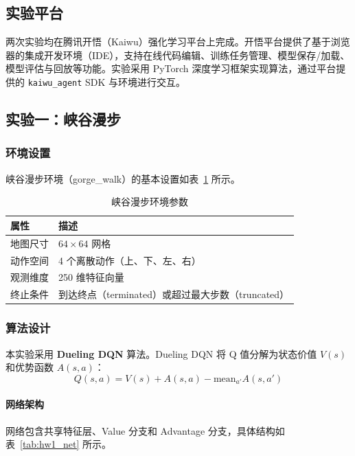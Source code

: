 \documentclass[12pt,a4paper]{article}
\begin{document}
\subsection{实验平台}

两次实验均在腾讯开悟（Kaiwu）强化学习平台上完成。开悟平台提供了基于浏览器的集成开发环境（IDE），支持在线代码编辑、训练任务管理、模型保存/加载、模型评估与回放等功能。实验采用 PyTorch 深度学习框架实现算法，通过平台提供的 \texttt{kaiwu\_agent} SDK 与环境进行交互。

\subsection{实验一：峡谷漫步}

\subsubsection{环境设置}

峡谷漫步环境（gorge\_walk）的基本设置如表~\ref{tab:hw1_env} 所示。

\begin{table}[htbp]
\centering
\caption{峡谷漫步环境参数}\label{tab:hw1_env}
\begin{tabular}{ll}
\toprule
\textbf{属性} & \textbf{描述} \\
\midrule
地图尺寸   & $64\times64$ 网格 \\
动作空间   & 4 个离散动作（上、下、左、右） \\
观测维度   & 250 维特征向量 \\
终止条件   & 到达终点（terminated）或超过最大步数（truncated） \\
\bottomrule
\end{tabular}
\end{table}

\subsubsection{算法设计}

本实验采用 \textbf{Dueling DQN} 算法。Dueling DQN 将 Q 值分解为状态价值 $V(s)$ 和优势函数 $A(s,a)$：
\begin{equation}
Q(s,a) = V(s) + A(s,a) - \text{mean}_{a'}A(s,a')
\end{equation}

\paragraph{网络架构}
网络包含共享特征层、Value 分支和 Advantage 分支，具体结构如表~\ref{tab:hw1_net} 所示。
\end{document}
